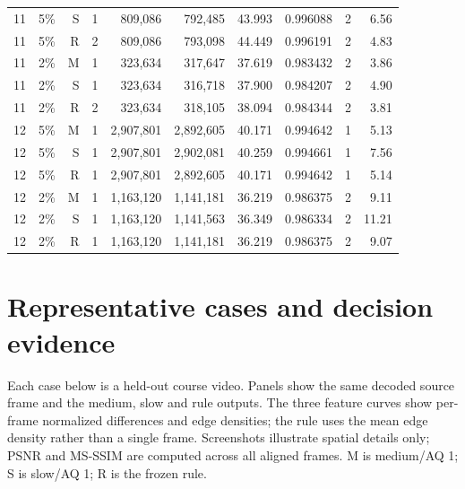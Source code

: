 \documentclass[10pt,a4paper]{article}
\begin{document}
\begin{longtable}{llrlrrrlrr}
11 & 5\% & S & 1 & 809,086 & 792,485 & 43.993 & 0.996088 & 2 & 6.56 \\
11 & 5\% & R & 2 & 809,086 & 793,098 & 44.449 & 0.996191 & 2 & 4.83 \\
11 & 2\% & M & 1 & 323,634 & 317,647 & 37.619 & 0.983432 & 2 & 3.86 \\
11 & 2\% & S & 1 & 323,634 & 316,718 & 37.900 & 0.984207 & 2 & 4.90 \\
11 & 2\% & R & 2 & 323,634 & 318,105 & 38.094 & 0.984344 & 2 & 3.81 \\
12 & 5\% & M & 1 & 2,907,801 & 2,892,605 & 40.171 & 0.994642 & 1 & 5.13 \\
12 & 5\% & S & 1 & 2,907,801 & 2,902,081 & 40.259 & 0.994661 & 1 & 7.56 \\
12 & 5\% & R & 1 & 2,907,801 & 2,892,605 & 40.171 & 0.994642 & 1 & 5.14 \\
12 & 2\% & M & 1 & 1,163,120 & 1,141,181 & 36.219 & 0.986375 & 2 & 9.11 \\
12 & 2\% & S & 1 & 1,163,120 & 1,141,563 & 36.349 & 0.986334 & 2 & 11.21 \\
12 & 2\% & R & 1 & 1,163,120 & 1,141,181 & 36.219 & 0.986375 & 2 & 9.07 \\
\bottomrule\end{longtable}\normalsize

\section{Representative cases and decision evidence}
Each case below is a held-out course video. Panels show the same decoded source frame and the medium, slow and rule outputs. The three feature curves show per-frame normalized differences and edge densities; the rule uses the mean edge density rather than a single frame. Screenshots illustrate spatial details only; PSNR and MS-SSIM are computed across all aligned frames. M is medium/AQ 1; S is slow/AQ 1; R is the frozen rule.
\clearpage
\end{document}
